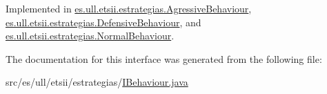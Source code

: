 Implemented in \hyperlink{classes_1_1ull_1_1etsii_1_1estrategias_1_1_agressive_behaviour_ad7aa2126933c4cb9af2d1341fc21bda5}{es.\-ull.\-etsii.\-estrategias.\-Agressive\-Behaviour}, \hyperlink{classes_1_1ull_1_1etsii_1_1estrategias_1_1_defensive_behaviour_ae42e80d346434436ca75b53b6f2b5e4c}{es.\-ull.\-etsii.\-estrategias.\-Defensive\-Behaviour}, and \hyperlink{classes_1_1ull_1_1etsii_1_1estrategias_1_1_normal_behaviour_a746dcf0cdc749b5b836e2c1bcbb4e7ee}{es.\-ull.\-etsii.\-estrategias.\-Normal\-Behaviour}.



The documentation for this interface was generated from the following file\-:\begin{DoxyCompactItemize}
\item 
src/es/ull/etsii/estrategias/\hyperlink{_i_behaviour_8java}{I\-Behaviour.\-java}\end{DoxyCompactItemize}
